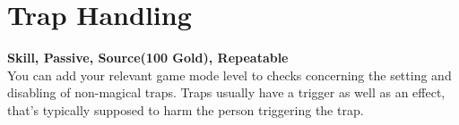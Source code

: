 \section{Trap Handling}\label{sec:trapHandling}
\textbf{Skill, Passive, Source(100 Gold), Repeatable}\\
You can add your relevant game mode level to checks concerning the setting and disabling of non-magical traps.
Traps usually have a trigger as well as an effect, that's typically supposed to harm the person triggering the trap.\\
